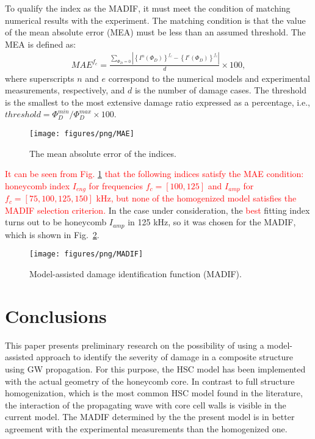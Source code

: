 \documentclass[sensors,article,submit,moreauthors,pdftex]{Definitions/mdpi}
\begin{document}
To qualify the index as the MADIF, it must meet the condition of matching numerical results with the experiment.
The matching condition is that the value of the mean absolute error (MEA) must be less than an assumed threshold.
The MEA is defined as:
\begin{eqnarray}
	MAE^{f_c} = \frac{\sum_{\Phi_D=0}{\left |\left\{I^{n}(\Phi_D)\right\}^{f_c}-\left\{I^{e}(\Phi_D)\right\}^{f_c}\right |}}{d}\times100,
\end{eqnarray}
where superscripts \(n\) and \(e\) correspond to the numerical models and experimental measurements, respectively, and \(d\) is the number of damage cases. The threshold is the smallest to the most extensive damage ratio expressed as a percentage, i.e., \(threshold=\Phi_D^{min}/\Phi_D^{max}\times100\).
\begin{figure}
	\begin{center}
		\texttt{[image: figures/png/MAE]}
	\end{center}
	\caption{The mean absolute error of the indices.}
	\label{fig:MAE}
\end{figure}
\textcolor{red}{It can be seen from Fig. \ref{fig:MAE} that the following indices satisfy the MAE condition: honeycomb index \(I_{eng}\) for frequencies \(f_c=[100,125]\) and \(I_{amp}\) for \(f_c=[75,100, 125, 150]\) kHz, but none of the homogenized model satisfies the MADIF selection criterion.}
In the case under consideration, the \textcolor{red}{best} fitting index turns out to be honeycomb \(I_{amp}\) in 125 kHz, so it was chosen for the MADIF, which is shown in Fig.~\ref{fig:MADIF}. 
\begin{figure}
	\begin{center}
		\texttt{[image: figures/png/MADIF]}
	\end{center}
	\caption{Model-assisted damage identification function (MADIF).}
	\label{fig:MADIF}
\end{figure}

\clearpage
\section{Conclusions}
\label{sec:conc}
This paper presents preliminary research on the possibility of using a model-assisted approach to identify the severity of damage in a composite structure using GW propagation.
For this purpose, the HSC model has been implemented with the actual geometry of the honeycomb core.
In contrast to  full structure homogenization, which is the most common HSC model found in the literature, the interaction of the propagating wave with core cell walls is visible in the current model.
The MADIF determined by the the present model is in better agreement with the experimental measurements than the homogenized one.
\end{document}
